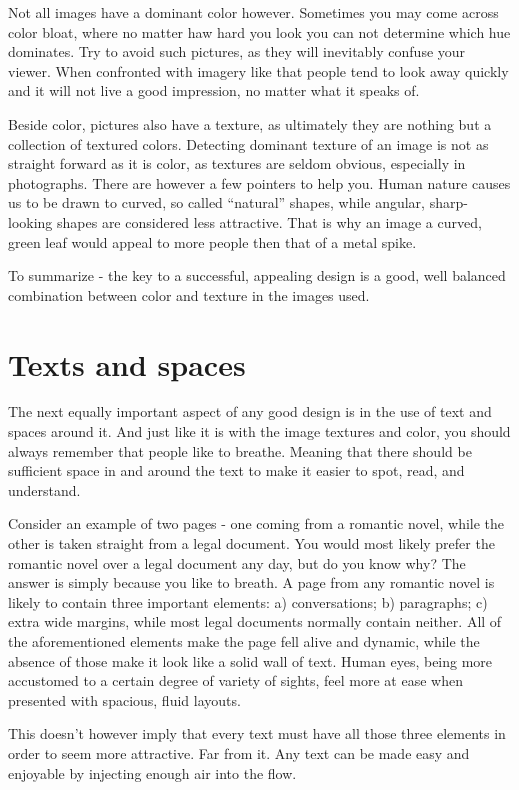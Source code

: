 Not all images have a dominant color however. Sometimes you may come across
color bloat, where no matter haw hard you look you can not determine which hue
dominates. Try to avoid such pictures, as they will inevitably confuse your
viewer. When confronted with imagery like that people tend to look away quickly
and it will not live a good impression, no matter what it speaks of.

Beside color, pictures also have a texture, as ultimately they are nothing but a
collection of textured colors. Detecting dominant texture of an image is not as
straight forward as it is color, as textures are seldom obvious, especially in
photographs. There are however a few pointers to help you. Human nature causes
us to be drawn to curved, so called “natural” shapes, while angular,
sharp-looking shapes are considered less attractive. That is why an image a
curved, green leaf would appeal to more people then that of a metal spike.

To summarize - the key to a successful, appealing design is a good, well
balanced combination between color and texture in the images used.

\section*{Texts and spaces}

The next equally important aspect of any good design is in the use of text and
spaces around it. And just like it is with the image textures and color, you
should always remember that people like to breathe. Meaning that there should be
sufficient space in and around the text to make it easier to spot, read, and
understand.

Consider an example of two pages - one coming from a romantic novel, while the
other is taken straight from a legal document. You would most likely prefer the
romantic novel over a legal document any day, but do you know why? The answer is
simply because you like to breath. A page from any romantic novel is likely to
contain three important elements: a) conversations; b) paragraphs; c) extra wide
margins, while most legal documents normally contain neither. All of the
aforementioned elements make the page fell alive and dynamic, while the absence
of those make it look like a solid wall of text. Human eyes, being more
accustomed to a certain degree of variety of sights, feel more at ease when
presented with spacious, fluid layouts.

This doesn’t however imply that every text must have all those three elements in
order to seem more attractive. Far from it. Any text can be made easy and
enjoyable by injecting enough air into the flow.

